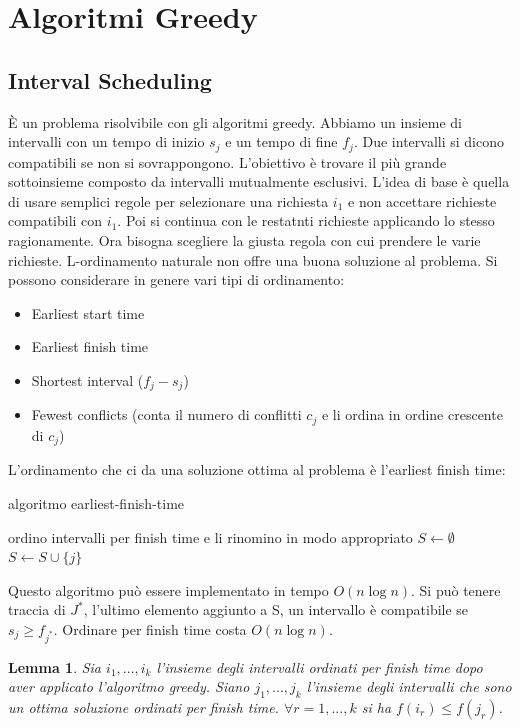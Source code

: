 \documentclass{article}
\newtheorem{lemma}{Lemma}[subsection]
\begin{document}
\section{Algoritmi Greedy}
\subsection{Interval Scheduling}
È un problema risolvibile con gli algoritmi greedy. Abbiamo un insieme di intervalli con un tempo di inizio $s_j$ e un tempo di fine $f_j$. Due intervalli si dicono compatibili se non si sovrappongono. L'obiettivo è trovare il più grande sottoinsieme composto da intervalli mutualmente esclusivi. L'idea di base è quella di usare semplici regole per selezionare una richiesta $i_1$ e non accettare richieste compatibili con $i_1$. Poi si continua con le restatnti richieste applicando lo stesso ragionamente. Ora bisogna scegliere la giusta  regola con cui prendere le varie richieste. L-ordinamento naturale non offre una buona soluzione al problema. Si possono considerare in genere vari tipi di ordinamento:
\begin{itemize}
    \item Earliest start time
    \item Earliest finish time
    \item Shortest interval ($f_j - s_j$)
    \item Fewest conflicts (conta il numero di conflitti $c_j$ e li ordina in ordine crescente di $c_j$)
\end{itemize}
L'ordinamento che ci da una soluzione ottima al problema è l'earliest finish time:
\begin{center}
\begin{algorithm}
\caption{algoritmo earliest-finish-time}
ordino intervalli per finish time e li rinomino in modo appropriato\;
$S \gets \emptyset$\;
    { {$ S\gets S \cup \{j\}$}}
\end{algorithm}
\end{center}
Questo algoritmo può essere implementato in tempo $O(n \log{n})$. Si può tenere traccia di $J^*$, l'ultimo elemento aggiunto a S, un intervallo è compatibile se $s_j \geq f_{j^*}$. Ordinare per finish time costa $O(n \log{n})$.
\begin{lemma}
Sia $i_1,...,i_k$ l'insieme degli intervalli ordinati per finish time dopo aver applicato l'algoritmo greedy. Siano $j_1,...,j_k$ l'insieme degli intervalli che sono un ottima soluzione ordinati per finish time.
$\forall r=1,...,k$ si ha $f(i_r) \leq f(j_r)$. 
\end{lemma}
\end{document}
